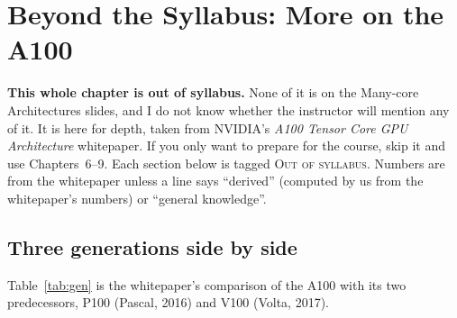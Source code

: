 \chapter{Beyond the Syllabus: More on the A100}
\label{ch:beyond}

\begin{outofsyllabus}
\textbf{This whole chapter is out of syllabus.} None of it is on the Many-core Architectures slides, and I do not know whether the instructor will mention
any of it. It is here for depth, taken from NVIDIA's \emph{A100 Tensor Core GPU Architecture} whitepaper. If you only want to prepare for the course, skip it and use Chapters~6--9.
Each section below is tagged \textsc{Out of syllabus}. Numbers are from the whitepaper unless a line says ``derived'' (computed by us from the whitepaper's numbers) or ``general knowledge''.
\end{outofsyllabus}

\section{Three generations side by side}
\oos

Table~\ref{tab:gen} is the whitepaper's comparison of the A100 with its two predecessors, P100 (Pascal, 2016) and V100 (Volta, 2017).

